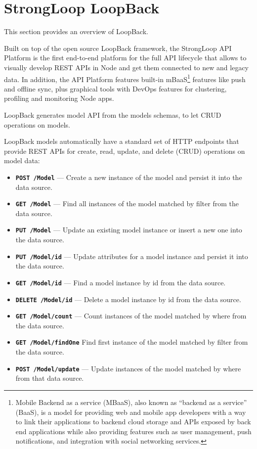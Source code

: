 \section{StrongLoop LoopBack}
\label{sec:TCH_loopback}

This section provides an overview of LoopBack.

Built on top of the open source LoopBack framework, the StrongLoop API Platform is the first end-to-end platform for the full API lifecycle that allows to visually develop REST APIs in Node and get them connected to new and legacy data. In addition, the API Platform features built-in mBaaS\footnote{Mobile Backend as a service (MBaaS), also known as ``backend as a service'' (BaaS), is a model for providing web and mobile app developers with a way to link their applications to backend cloud storage and APIs exposed by back end applications while also providing features such as user management, push notifications, and integration with social networking services.} features like push and offline sync, plus graphical tools with DevOps features for clustering, profiling and monitoring Node apps.

LoopBack generates model API from the models schemas, to let CRUD operations on models.

LoopBack models automatically have a standard set of HTTP endpoints that provide REST APIs for create, read, update, and delete (CRUD) operations on model data:
\begin{itemize}
\item \texttt{\textbf{POST /Model}} — Create a new instance of the model and persist it into the data source.
\item \texttt{\textbf{GET /Model}} — Find all instances of the model matched by filter from the data source.
\item \texttt{\textbf{PUT /Model}} — Update an existing model instance or insert a new one into the data source.
\item \texttt{\textbf{PUT /Model/{id}}} — Update attributes for a model instance and persist it into the data source.
\item \texttt{\textbf{GET /Model/{id}}} — Find a model instance by id from the data source.
\item \texttt{\textbf{DELETE /Model/{id}}} — Delete a model instance by id from the data source.
\item \texttt{\textbf{GET /Model/count}} — Count instances of the model matched by where from the data source.
\item \texttt{\textbf{GET /Model/findOne}} Find first instance of the model matched by filter from the data source.
\item \texttt{\textbf{POST /Model/update}} — Update instances of the model matched by where from that data source.
\end{itemize}


